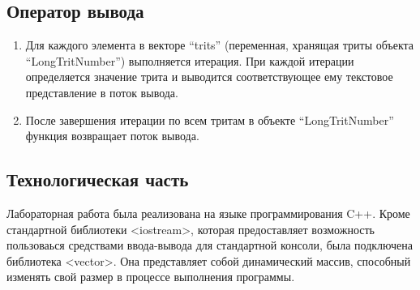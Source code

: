 \documentclass[12pt, a4paper]{article}
\begin{document}
\subsection{Оператор вывода}
\begin{enumerate}
    \item Для каждого элемента в векторе ``trits'' (переменная, хранящая триты объекта\\ ``LongTritNumber'') выполняется итерация. При каждой итерации определяется значение трита и выводится соответствующее ему текстовое представление в поток вывода.
    \item После завершения итерации по всем тритам в объекте ``LongTritNumber'' функция возвращает поток вывода.
\end{enumerate}

\newpage
\begin{center}
    \section{Технологическая часть}
\end{center}

Лабораторная работа была реализована на языке программирования C++. Кроме стандартной библиотеки <iostream>, которая предоставляет возможность пользоваься средствами ввода-вывода для стандартной консоли, была подключена библиотека <vector>. Она представляет собой динамический массив, способный изменять свой размер в процессе выполнения программы.
\end{document}
